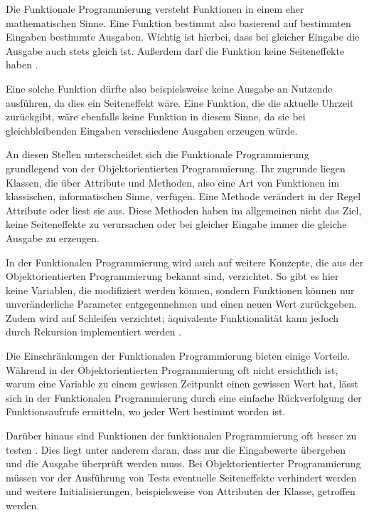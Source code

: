 Die Funktionale Programmierung versteht Funktionen in einem eher mathematischen Sinne. Eine Funktion bestimmt also basierend auf bestimmten Eingaben bestimmte Ausgaben. Wichtig ist hierbei, dass bei gleicher Eingabe die Ausgabe auch stets gleich ist. Außerdem darf die Funktion keine Seiteneffekte haben \cite{hinsen2009functional_programming}.

Eine solche Funktion dürfte also beispielsweise keine Ausgabe an Nutzende ausführen, da dies ein Seiteneffekt wäre. Eine Funktion, die die aktuelle Uhrzeit zurückgibt, wäre ebenfalls keine Funktion in diesem Sinne, da sie bei gleichbleibenden Eingaben verschiedene Ausgaben erzeugen würde.

An diesen Stellen unterscheidet sich die Funktionale Programmierung grundlegend von der Objektorientierten Programmierung. Ihr zugrunde liegen Klassen, die über Attribute und Methoden, also eine Art von Funktionen im klassischen, informatischen Sinne, verfügen. Eine Methode verändert in der Regel Attribute oder liest sie aus. Diese Methoden haben im allgemeinen nicht das Ziel, keine Seiteneffekte zu verursachen oder bei gleicher Eingabe immer die gleiche Ausgabe zu erzeugen.

In der Funktionalen Programmierung wird auch auf weitere Konzepte, die aus der Objektorientierten Programmierung bekannt sind, verzichtet. So gibt es hier keine Variablen, die modifiziert werden können, sondern Funktionen können nur unveränderliche Parameter entgegennehmen und einen neuen Wert zurückgeben. Zudem wird auf Schleifen verzichtet; äquivalente Funktionalität kann jedoch durch Rekursion implementiert werden \cite{hinsen2009functional_programming}.

Die Einschränkungen der Funktionalen Programmierung bieten einige Vorteile. Während in der Objektorientierten Programmierung oft nicht ersichtlich ist, warum eine Variable zu einem gewissen Zeitpunkt einen gewissen Wert hat, lässt sich in der Funktionalen Programmierung durch eine einfache Rückverfolgung der Funktionsaufrufe ermitteln, wo jeder Wert bestimmt worden ist.

Darüber hinaus sind Funktionen der funktionalen Programmierung oft besser zu testen \cite{hinsen2009functional_programming} \cite{benton2016js_functional}. Dies liegt unter anderem daran, dass nur die Eingabewerte übergeben und die Ausgabe überprüft werden muss. Bei Objektorientierter Programmierung müssen vor der Ausführung von Tests eventuelle Seiteneffekte verhindert werden und weitere Initialisierungen, beispielsweise von Attributen der Klasse, getroffen werden.

